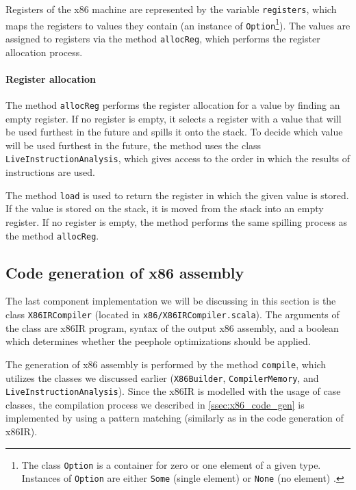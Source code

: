 \documentclass[thesis=M,english]{FITthesis}[2019/12/23]
\begin{document}
Registers of the x86 machine are represented by the variable \texttt{registers}, which maps the registers to values they contain (an instance of \texttt{Option}\footnote{The class \texttt{Option} is a container for zero or one element of a given type. Instances of \texttt{Option} are either \texttt{Some} (single element) or \texttt{None} (no element) \cite{option}.}). The values are assigned to registers via the method \texttt{allocReg}, which performs the register allocation process.

\paragraph*{Register allocation} The method \texttt{allocReg} performs the register allocation for a value by finding an empty register. If no register is empty, it selects a register with a value that will be used furthest in the future and spills it onto the stack. To decide which value will be used furthest in the future, the method uses the class \texttt{LiveInstructionAnalysis}, which gives access to the order in which the results of instructions are used.

The method \texttt{load} is used to return the register in which the given value is stored. If the value is stored on the stack, it is moved from the stack into an empty register. If no register is empty, the method performs the same spilling process as the method \texttt{allocReg}.


\subsection{Code generation of x86 assembly}
The last component implementation we will be discussing in this section is the class \texttt{X86IRCompiler} (located in \texttt{x86/X86IRCompiler.scala}). The arguments of the class are x86IR program, syntax of the output x86 assembly, and a boolean which determines whether the peephole optimizations should be applied.

The generation of x86 assembly is performed by the method \texttt{compile}, which utilizes the classes we discussed earlier (\texttt{X86Builder}, \texttt{CompilerMemory}, and \texttt{LiveInstructionAnalysis}). Since the x86IR is modelled with the usage of case classes, the compilation process we described in \autoref{ssec:x86_code_gen} is implemented by using a pattern matching (similarly as in the code generation of x86IR).
\end{document}
